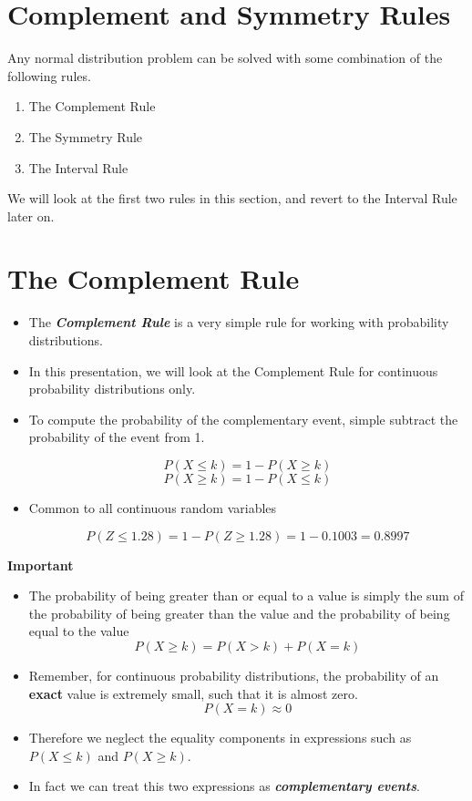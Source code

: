 \documentclass[a4paper,12pt]{article}
\begin{document}
\section*{Complement and Symmetry Rules}

Any normal distribution problem can be solved with some combination of the following rules.
\begin{enumerate}
\item The Complement Rule
\item The Symmetry Rule
\item The Interval Rule
\end{enumerate}
We will look at the first two rules in this section, and revert to the Interval Rule later on.
	
	\section*{The Complement Rule}
	
	\begin{itemize}
		\item The \textbf{\textit{Complement Rule}} is a very simple rule for working with probability distributions.
		\item In this presentation, we will look at the Complement Rule for continuous probability distributions only.
		
		
		\item To compute the probability of the complementary event, simple subtract the probability of the event from 1.
		
		\[P(X \leq k) = 1- P(X \geq k) \]
		\[P(X \geq k) = 1- P(X \leq k) \]
		 \item Common to all continuous random variables


\[P(Z \leq 1.28) = 1 - P(Z \geq 1.28)  = 1-0.1003 = 0.8997\]
	\end{itemize}	
	

	
	
	\begin{framed}
	\noindent \textbf{Important}
	\begin{itemize}
		
	
		\item The probability of being greater than or equal to a value is simply the sum of the probability of being greater than the value and the probability of being equal to the value
		\[  P(X \geq k)  = P( X > k) + P(X = k) \]
			\item Remember, for continuous probability distributions, the probability of an \textbf{exact} value is extremely small, such that it is almost zero.
				\[P(X = k) \approx 0\]
		\item Therefore we neglect the equality components in expressions such as
		$P(X \leq k)$ and $P(X \geq k)$.
		\item In fact we can treat this two expressions as \textbf{\textit{complementary events}}.
	\end{itemize}
	\end{framed}
	
\end{document}
